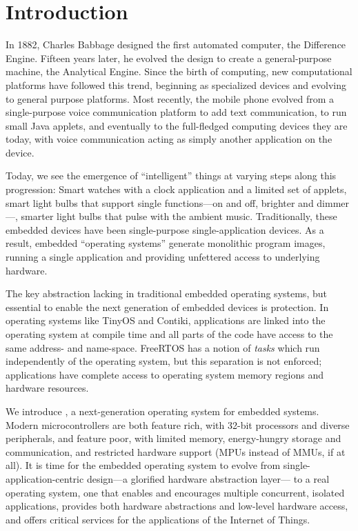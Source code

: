 \section{Introduction}

In 1882, Charles Babbage designed the first automated computer, the Difference
Engine. Fifteen years later, he evolved the design to create a general-purpose
machine, the Analytical Engine. Since the birth of computing, new
computational platforms have followed this trend, beginning as specialized
devices and evolving to general purpose platforms.
Most recently, the mobile phone evolved from a single-purpose voice
communication platform to add text communication, to run small Java applets,
and eventually to the full-fledged computing devices they are today, with
voice communication acting as simply another application on the device.

Today, we see the emergence of ``intelligent'' things at varying steps along
this progression: Smart watches with a clock application and a limited set of
applets, smart light bulbs that support single functions---on and off,
brighter and dimmer---, smarter light bulbs that pulse with the ambient music.
%
Traditionally, these embedded devices have been single-purpose
single-application devices. As a result, embedded ``operating systems''
generate monolithic program images, running a single application and
providing unfettered access to underlying hardware.

The key abstraction lacking in traditional embedded operating systems, but
essential to enable the next generation of embedded devices is protection. In
operating systems like TinyOS and Contiki, applications are linked into the
operating system at compile time and all parts of the code have access to the
same address- and name-space. FreeRTOS has a notion of \emph{tasks} which run
independently of the operating system, but this separation is not enforced;
applications have complete access to operating system memory regions and
hardware resources.

We introduce \name, a next-generation operating system for embedded systems.
Modern microcontrollers are both feature rich, with 32-bit processors and
diverse peripherals, and feature poor, with limited memory, energy-hungry
storage and communication, and restricted hardware support (MPUs instead of
MMUs, if at all).
%
It is time for the embedded operating system to evolve from single-application-centric
design---a glorified hardware abstraction layer---%
to a real operating system, %
one that enables and encourages multiple concurrent, isolated applications,
provides both hardware abstractions and low-level hardware access, and offers
critical services for the applications of the Internet of Things.

